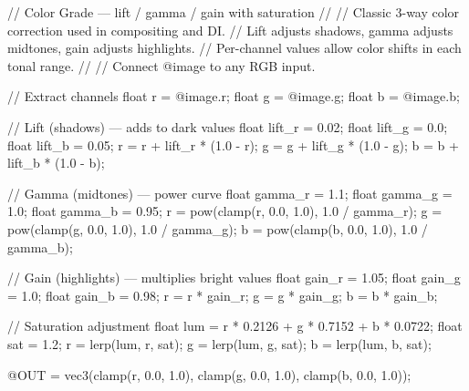 // Color Grade — lift / gamma / gain with saturation
//
// Classic 3-way color correction used in compositing and DI.
// Lift adjusts shadows, gamma adjusts midtones, gain adjusts highlights.
// Per-channel values allow color shifts in each tonal range.
//
// Connect @image to any RGB input.

// Extract channels
float r = @image.r;
float g = @image.g;
float b = @image.b;

// Lift (shadows) — adds to dark values
float lift_r = 0.02;
float lift_g = 0.0;
float lift_b = 0.05;
r = r + lift_r * (1.0 - r);
g = g + lift_g * (1.0 - g);
b = b + lift_b * (1.0 - b);

// Gamma (midtones) — power curve
float gamma_r = 1.1;
float gamma_g = 1.0;
float gamma_b = 0.95;
r = pow(clamp(r, 0.0, 1.0), 1.0 / gamma_r);
g = pow(clamp(g, 0.0, 1.0), 1.0 / gamma_g);
b = pow(clamp(b, 0.0, 1.0), 1.0 / gamma_b);

// Gain (highlights) — multiplies bright values
float gain_r = 1.05;
float gain_g = 1.0;
float gain_b = 0.98;
r = r * gain_r;
g = g * gain_g;
b = b * gain_b;

// Saturation adjustment
float lum = r * 0.2126 + g * 0.7152 + b * 0.0722;
float sat = 1.2;
r = lerp(lum, r, sat);
g = lerp(lum, g, sat);
b = lerp(lum, b, sat);

@OUT = vec3(clamp(r, 0.0, 1.0), clamp(g, 0.0, 1.0), clamp(b, 0.0, 1.0));

